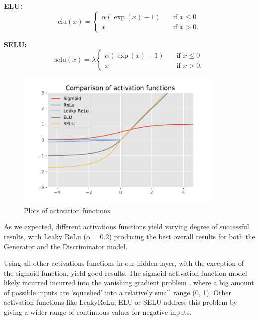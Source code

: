 \textbf{ELU:}
\begin{equation}
  \text{elu}(x) = 
  \begin{cases} 
      \alpha (\exp(x) - 1)      & \quad \text{if } x \leq  0 \\
      x       & \quad \text{if } x > 0 .
    \end{cases} 
\end{equation} 

\textbf{SELU:}
\begin{equation}
  \text{selu}(x) = \lambda
  \begin{cases} 
      \alpha (\exp(x) - 1)      & \quad \text{if } x \leq  0 \\
      x       & \quad \text{if } x > 0 .
    \end{cases} 
\end{equation} 

\begin{figure}
\vskip -3mm
\begin{center}
\centerline{\includegraphics[width=10cm]{Figures/ActivationFns}}
\caption{Plots of activation functions}
\label{fig:activationfns}
\end{center}
\vskip -3mm
\end{figure}
As we expected, different activations functions yield varying degree of successful results, with Leaky ReLu ($\alpha=0.2$) producing the best overall results for both the Generator and the Discriminator model.

Using all other activations functions in our hidden layer, with the exception of the sigmoid function, yield good results.
The sigmoid activation function model likely incurred incurred into the vanishing gradient problem \citep{DBLP:journals/corr/abs-1211-5063}, where a big amount of possible inputs are 'squashed' into a relatively small range (0, 1). Other activation functions like LeakyReLu, ELU or SELU address this problem by giving a wider range of continuous values for negative inputs.

